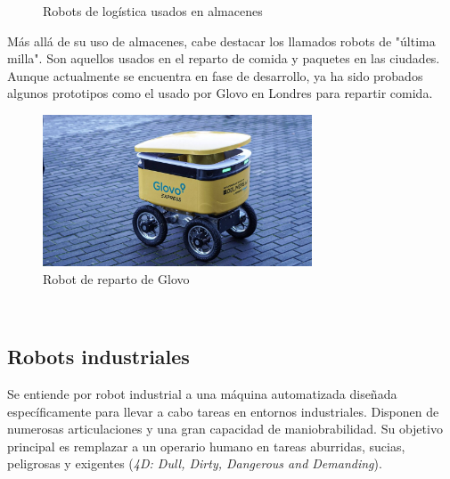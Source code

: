 \begin{figure} [h!]
    \centering    
    \hspace{1cm}
    \caption{Robots de logística usados en almacenes}
\end{figure}
\newpage
Más allá de su uso de almacenes, cabe destacar los llamados robots de "última milla". Son aquellos usados en el reparto de comida y 
paquetes en las ciudades. Aunque actualmente se encuentra en fase de desarrollo, ya ha sido probados algunos 
prototipos como el usado por Glovo en Londres para repartir comida.
\begin{figure} [ht!]
    \begin{center}
      \includegraphics[width=8cm]{figs/reparto.jpg}
    \end{center}
    \caption{Robot de reparto de Glovo}
    \label{fig:glovo}
\end{figure}\ 



\newpage

\subsection{Robots industriales}
Se entiende por robot industrial a una máquina automatizada diseñada específicamente para llevar a cabo tareas en entornos industriales. 
Disponen de numerosas articulaciones y una gran capacidad de maniobrabilidad. Su objetivo principal es remplazar a un 
operario humano en tareas aburridas, sucias, peligrosas y exigentes (\textit{4D: Dull, Dirty, Dangerous and Demanding}).

